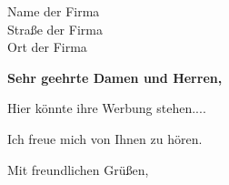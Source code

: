 \documentclass[12pt]{letter} %
\begin{document}

\begin{letter}{Name der Firma \\ Straße der Firma \\ Ort der Firma}


\opening{\textbf{Sehr geehrte Damen und Herren,}}

Hier könnte ihre Werbung stehen....

Ich freue mich von Ihnen zu hören.

\closing{Mit freundlichen Grüßen,}
 



\end{letter}
 
\end{document}
